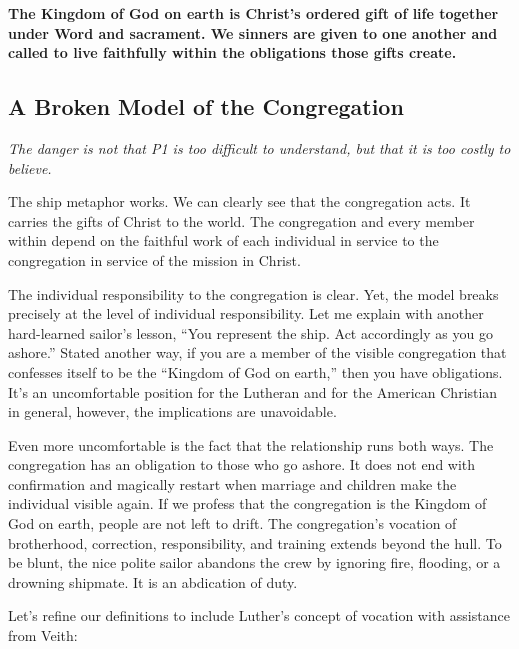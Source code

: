 \textbf{The Kingdom of God on earth is Christ’s ordered gift of life together under Word and sacrament. We sinners are given to one another and called to live faithfully within the obligations those gifts create.}




\subsection{A Broken Model of the Congregation}

\textit{The danger is not that P1 is too difficult to understand, but that it is too costly to believe.}

The ship metaphor works. We can clearly see that the congregation acts. It carries the gifts of Christ to the world. The congregation and every member within depend on the faithful work of each individual in service to the congregation in service of the mission in Christ.

The individual responsibility to the congregation is clear. Yet, the model breaks precisely at the level of individual responsibility. Let me explain with another hard-learned sailor's lesson, ``You represent the ship. Act accordingly as you go ashore.'' Stated another way, if you are a member of the visible congregation that confesses itself to be the ``Kingdom of God on earth,'' then you have obligations. It's an uncomfortable position for the Lutheran and for the American Christian in general, however, the implications are unavoidable. 

Even more uncomfortable is the fact that the relationship runs both ways. The congregation has an obligation to those who go ashore. It does not end with confirmation and magically restart when marriage and children make the individual visible again. If we profess that the congregation is the Kingdom of God on earth, people are not left to drift. The congregation's vocation of brotherhood, correction, responsibility, and training extends beyond the hull. To be blunt, the nice polite sailor abandons the crew by ignoring fire, flooding, or a drowning shipmate. It is an abdication of duty.

Let's refine our definitions to include Luther's concept of vocation with assistance from Veith:

